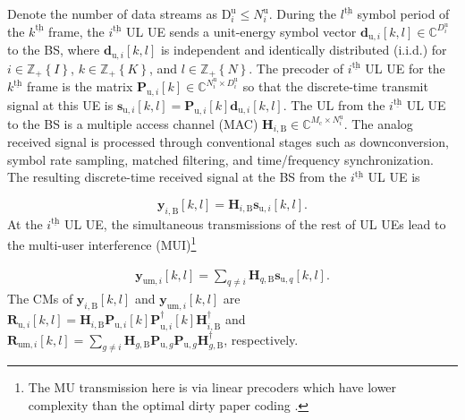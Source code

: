 \documentclass[10pt,journal]{IEEEtran}
\newcommand{\bracket}[1]{{\left [{#1}\right ]}}
\newcommand{\braces}[1]{{\left\{ {#1}\right\}}}
\newcommand{\ith}[1]    {{#1}^{\underline{\text{th}}}}
\newcommand{\cc}{_\mathrm{c}}
\newcommand{\B}{\textrm{B}}
\newcommand{\dui}{\mathbf{d}_{\textrm{u},i}\bracket{k,l}}
\newcommand{\PiB}{\mathbf{P}_{\textrm{u},i}\bracket{k}}
\newcommand{\PiBH}{\mathbf{P}^\dagger_{\textrm{u},i}\bracket{k}}
\newcommand{\HiB}{\mathbf{H}_{i,\textrm{B}}}
\newcommand{\HiBH}{\mathbf{H}^\dagger_{i,\textrm{B}}}
\theoremstyle{definition}
\begin{document}
Denote the number of data streams as $\mathrm{D}^\textrm{u}_i\leq \mathit{N}^{\textrm{u}}_i$. During the $\ith{l}$ symbol period of the $\ith{k}$ frame, the $\ith{i}$ UL UE sends a unit-energy symbol vector $\mathbf{d}_{\textrm{u},i}\bracket{k,l}\in \mathbb{C}^{D^{\textrm{u}}_i}$ to the BS, where $\mathbf{d}_{\textrm{u},i}\bracket{k,l}$ is independent and identically distributed (i.i.d.) for $i\in\mathbb{Z}_+\braces{\mathit{I}}$, $k\in\mathbb{Z}_+\braces{\mathit{K}}$, and $l\in\mathbb{Z}_+\braces{\mathit{N}}$. 
The precoder of $\ith{i}$ UL UE for the $\ith{k}$ frame is the matrix $\PiB\in\mathbb{C}^{\mathit{N}^{\textrm{u}}_i\times \mathit{D}^\textrm{u}_i}$ so that the discrete-time transmit signal at this UE is $\mathbf{s}_{\textrm{u},i}\bracket{k,l}=\PiB\mathbf{d}_{\textrm{u},i}\bracket{k,l}$. The UL from the $\ith{i}$ UL UE to the BS is a multiple access channel (MAC) $\mathbf{H}_{i,\textrm{B}}\in\mathbb{C}^{\mathit{M}\cc\times \mathit{N}^{\textrm{u}}_i}$. The analog received signal is processed through conventional stages such as downconversion, symbol rate sampling, matched filtering, and time/frequency synchronization. The resulting discrete-time received signal at the BS from the $\ith{i}$ UL UE is\cite{Heathvehicularcommradar} \par\noindent\small
\begin{equation}
\label{eq:ULFDcomm}
\mathbf{y}_{i,\textrm{B}}\bracket{k,l}=\mathbf{H}_{i,\textrm{B}}\mathbf{s}_{\textrm{u},i}\bracket{k,l}.
\end{equation}\normalsize
At the $\ith{i}$ UL UE, the simultaneous transmissions of the rest of UL UEs lead to the multi-user interference (MUI)\footnote{The MU transmission here is via linear precoders which have lower complexity than the optimal dirty paper coding \cite{tse2005fundamentals}.}  \par\noindent\small
\begin{align}
\mathbf{y}_{\textrm{um},i}\bracket{k,l}=\sum_{q\neq i}\mathbf{H}_{q,\textrm{B}}\mathbf{s}_{\textrm{u},q}\bracket{k,l}.\label{eq:mui}
\end{align}\normalsize
The CMs of 
$\mathbf{y}_{i,\textrm{B}}\bracket{k,l}$ and $\mathbf{y}_{\textrm{um},i}\bracket{k,l}$ are  $\mathbf{R}_{\textrm{u},i}\bracket{k,l}=\HiB\PiB\PiBH\HiBH$ and
$\mathbf{R}_{\textrm{um},i}\bracket{k,l}=\sum_{g\neq i }\mathbf{H}_{g,\textrm{B}}\mathbf{P}_{\textrm{u},g}\mathbf{P}_{\textrm{u},g}\mathbf{H}^\dagger_{g,\textrm{B}}$, respectively.
\end{document}
